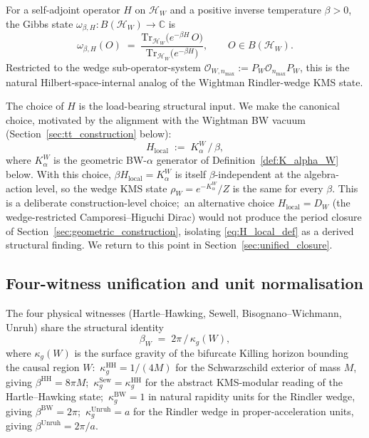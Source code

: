 \documentclass[11pt,a4paper]{article}
\theoremstyle{plain}
\theoremstyle{definition}
\newcommand{\nmax}{n_{\max}}
\newcommand{\Hilb}{\mathcal{H}}
\newcommand{\Op}{\mathcal{O}}
\newcommand{\C}{\mathbb{C}}
\newcommand{\Tr}{\mathrm{Tr}}
\newcommand{\BW}{\mathrm{BW}}
\newcommand{\HH}{\mathrm{HH}}
\newcommand{\Sew}{\mathrm{Sew}}
\newcommand{\Unruh}{\mathrm{Unruh}}
\begin{document}
For a self-adjoint operator $H$ on $\Hilb_W$ and a positive inverse
temperature $\beta > 0$, the Gibbs state
$\omega_{\beta, H}: B(\Hilb_W) \to \C$ is
\begin{equation}\label{eq:gibbs_state_def}
   \omega_{\beta, H}(O)
   \;=\; \frac{\Tr_{\Hilb_W}\bigl(e^{-\beta H}\, O\bigr)}
              {\Tr_{\Hilb_W}\bigl(e^{-\beta H}\bigr)},
   \qquad O \in B(\Hilb_W).
\end{equation}
Restricted to the wedge sub-operator-system
$\Op_{W, \nmax} := P_W \Op_{\nmax} P_W$, this is the natural
Hilbert-space-internal analog of the Wightman Rindler-wedge KMS state.

The choice of $H$ is the load-bearing structural input. We make the
canonical choice, motivated by the alignment with the Wightman BW
vacuum (Section~\ref{sec:tt_construction} below):
\begin{equation}\label{eq:H_local_def}
   H_{\mathrm{local}} \;:=\; K_\alpha^W \,/\, \beta,
\end{equation}
where $K_\alpha^W$ is the geometric BW-$\alpha$ generator of
Definition~\ref{def:K_alpha_W} below. With this choice, $\beta
H_{\mathrm{local}} = K_\alpha^W$ is itself $\beta$-independent at the
algebra-action level, so the wedge KMS state $\rho_W = e^{-K_\alpha^W}/Z$
is the same for every $\beta$. This is a deliberate construction-level
choice;\ an alternative choice $H_{\mathrm{local}} = D_W$ (the
wedge-restricted Camporesi--Higuchi Dirac) would not produce the
period closure of Section~\ref{sec:geometric_construction}, isolating
\eqref{eq:H_local_def} as a derived structural finding. We return to
this point in Section~\ref{sec:unified_closure}.

\subsection{Four-witness unification and unit normalisation}
\label{sec:four_witness_unit}

The four physical witnesses (Hartle--Hawking, Sewell,
Bisognano--Wichmann, Unruh) share the structural identity
\begin{equation}\label{eq:beta_kappa_g}
   \beta_W \;=\; 2\pi \,/\, \kappa_g(W),
\end{equation}
where $\kappa_g(W)$ is the surface gravity of the bifurcate Killing
horizon bounding the causal region $W$:\
$\kappa_g^{\HH} = 1/(4M)$ for the Schwarzschild exterior of mass $M$,
giving $\beta^{\HH} = 8\pi M$;\
$\kappa_g^{\Sew} = \kappa_g^{\HH}$ for the abstract KMS-modular
reading of the Hartle--Hawking state;\
$\kappa_g^{\BW} = 1$ in natural rapidity units for the Rindler wedge,
giving $\beta^{\BW} = 2\pi$;\
$\kappa_g^{\Unruh} = a$ for the Rindler wedge in proper-acceleration
units, giving $\beta^{\Unruh} = 2\pi / a$.
\end{document}
